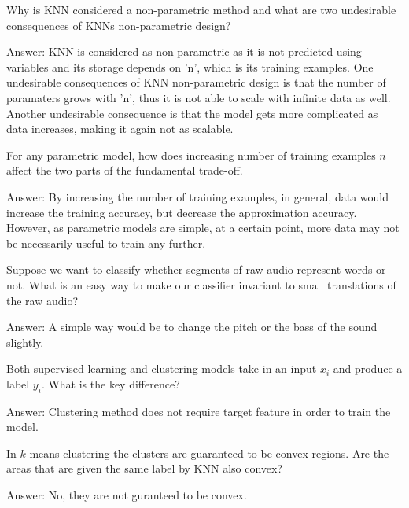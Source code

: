 \documentclass{article}
\def\ans#1{\par\gre{Answer: #1}}
\def\gre#1{{\color{gre}#1}}
\begin{document}
{ \item Why is KNN considered a non-parametric method and what are two undesirable consequences of KNNs non-parametric design?
\ans{KNN is considered as non-parametric as it is not predicted using variables and its storage depends on 'n', which is its training examples. One undesirable consequences of KNN non-parametric design is that the number of paramaters grows with 'n', thus it is not able to scale with infinite data as well. Another undesirable consequence is that the model gets more complicated as data increases, making it again not as scalable.}
 \item For any parametric model, how does increasing number of training examples $n$ affect the two parts of the fundamental trade-off.
\ans{By increasing the number of training examples, in general,  data would increase the training accuracy, but decrease the approximation accuracy. However, as parametric models are simple, at a certain point, more data may not be necessarily useful to train any further. }
 \item Suppose we want to classify whether segments of raw audio represent words or not. What is an easy way to make our classifier invariant to small translations of the raw audio?
\ans{A simple way would be to change the pitch or the bass of the sound slightly. }
 \item Both supervised learning and clustering models take in an input $x_i$ and produce a label $y_i$. What is the key difference?
\ans{Clustering method does not require target feature in order to train the model.}
 \item In $k$-means clustering the clusters are guaranteed to be convex regions. Are the areas that are given the same label by KNN also convex?
\ans{No, they are not guranteed to be convex.}
}
\end{document}
